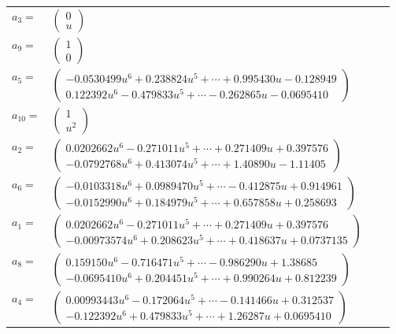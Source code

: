 \documentclass[1p]{elsarticle_modified}
\theoremstyle{definition}
\begin{document}
\begin{tabular}{m{7pt} m{180pt} m{7pt} m{180pt} }
\flushright $a_{3}=$&$\begin{pmatrix}0\\u\end{pmatrix}$ \\
\flushright $a_{9}=$&$\begin{pmatrix}1\\0\end{pmatrix}$ \\
\flushright $a_{5}=$&$\begin{pmatrix}-0.0530499 u^{6}+0.238824 u^{5}+\cdots+0.995430 u-0.128949\\0.122392 u^{6}-0.479833 u^{5}+\cdots-0.262865 u-0.0695410\end{pmatrix}$ \\
\flushright $a_{10}=$&$\begin{pmatrix}1\\u^2\end{pmatrix}$ \\
\flushright $a_{2}=$&$\begin{pmatrix}0.0202662 u^{6}-0.271011 u^{5}+\cdots+0.271409 u+0.397576\\-0.0792768 u^{6}+0.413074 u^{5}+\cdots+1.40890 u-1.11405\end{pmatrix}$ \\
\flushright $a_{6}=$&$\begin{pmatrix}-0.0103318 u^{6}+0.0989470 u^{5}+\cdots-0.412875 u+0.914961\\-0.0152990 u^{6}+0.184979 u^{5}+\cdots+0.657858 u+0.258693\end{pmatrix}$ \\
\flushright $a_{1}=$&$\begin{pmatrix}0.0202662 u^{6}-0.271011 u^{5}+\cdots+0.271409 u+0.397576\\-0.00973574 u^{6}+0.208623 u^{5}+\cdots+0.418637 u+0.0737135\end{pmatrix}$ \\
\flushright $a_{8}=$&$\begin{pmatrix}0.159150 u^{6}-0.716471 u^{5}+\cdots-0.986290 u+1.38685\\-0.0695410 u^{6}+0.204451 u^{5}+\cdots+0.990264 u+0.812239\end{pmatrix}$ \\
\flushright $a_{4}=$&$\begin{pmatrix}0.00993443 u^{6}-0.172064 u^{5}+\cdots-0.141466 u+0.312537\\-0.122392 u^{6}+0.479833 u^{5}+\cdots+1.26287 u+0.0695410\end{pmatrix}$ \\

\end{tabular}
\end{document}
